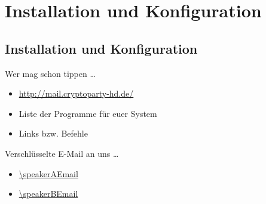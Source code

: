 \section{Installation und Konfiguration}
\subsection*{Installation und Konfiguration}
\begin{frame}{Wer mag schon tippen \dots}
	\begin{itemize}
		\item \url{http://mail.cryptoparty-hd.de/}
		\item Liste der Programme für euer System
		\item Links bzw. Befehle
	\end{itemize}
\end{frame}

\blackframe

%

\begin{frame}{Verschlüsselte E-Mail an uns \dots}
	\begin{itemize}
		\item \url{\speakerAEmail}
		\item \url{\speakerBEmail}
	\end{itemize}
\end{frame}

\blackframe

%
%
%




